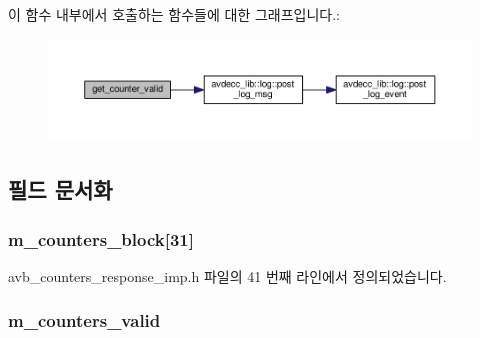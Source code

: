이 함수 내부에서 호출하는 함수들에 대한 그래프입니다.\+:
\nopagebreak
\begin{figure}[H]
\begin{center}
\leavevmode
\includegraphics[width=350pt]{classavdecc__lib_1_1avb__counters__response__imp_a192c298bbf4dbeef7d3d88d892732455_cgraph}
\end{center}
\end{figure}




\subsection{필드 문서화}
\subsubsection[{\texorpdfstring{m\+\_\+counters\+\_\+block}{m_counters_block}}]{ m\+\_\+counters\+\_\+block\mbox{[}31\mbox{]}\hspace{0.3cm}{\ttfamily [private]}}\hypertarget{classavdecc__lib_1_1avb__counters__response__imp_a4280ad18b84e17884a0eca22237e22a9}{}\label{classavdecc__lib_1_1avb__counters__response__imp_a4280ad18b84e17884a0eca22237e22a9}


avb\+\_\+counters\+\_\+response\+\_\+imp.\+h 파일의 41 번째 라인에서 정의되었습니다.

\subsubsection[{\texorpdfstring{m\+\_\+counters\+\_\+valid}{m_counters_valid}}]{ m\+\_\+counters\+\_\+valid\hspace{0.3cm}{\ttfamily [private]}}\hypertarget{classavdecc__lib_1_1avb__counters__response__imp_ab528aa8ed91b0a6453238e605c451ce8}{}\label{classavdecc__lib_1_1avb__counters__response__imp_ab528aa8ed91b0a6453238e605c451ce8}


